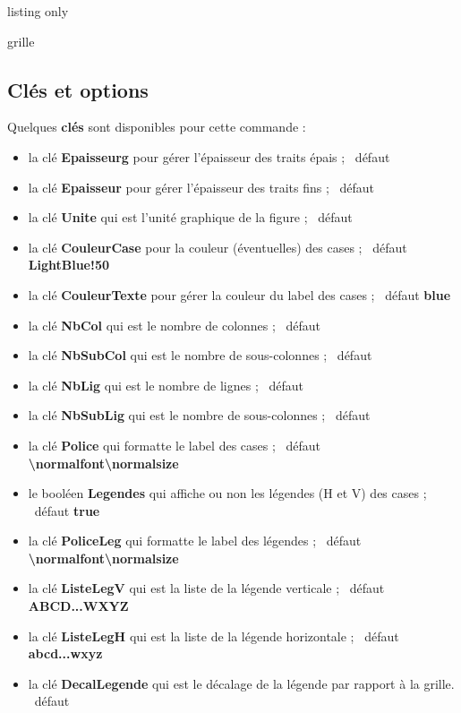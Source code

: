 \documentclass[a4paper,french,11pt]{article}
\newcommand\Cle[1]{{\bfseries\sffamily\textlangle #1\textrangle}}
\begin{document}
\begin{PresCodeTexPL}{listing only}

\begin{EnvSudoMaths}[clés]{grille}
\end{EnvSudoMaths}
\end{PresCodeTexPL}

\pagebreak

\subsection{Clés et options}

\begin{cautionblock}
Quelques \Cle{clés} sont disponibles pour cette commande :

\begin{itemize}
	\item la clé \Cle{Epaisseurg} pour gérer l'épaisseur des traits épais ; \hfill~défaut \Cle{1.5pt}
	\item la clé \Cle{Epaisseur} pour gérer l'épaisseur des traits fins ; \hfill~défaut \Cle{0.5pt}
	\item la clé \Cle{Unite} qui est l'unité graphique de la figure ; \hfill~défaut \Cle{1cm}
	\item la clé \Cle{CouleurCase} pour la couleur (éventuelles) des cases ; \hfill~défaut \Cle{LightBlue!50}
	\item la clé \Cle{CouleurTexte} pour gérer la couleur du label des cases ; \hfill~défaut \Cle{blue}
	\item la clé \Cle{NbCol} qui est le nombre de colonnes ; \hfill~défaut \Cle{9}
	\item la clé \Cle{NbSubCol} qui est le nombre de sous-colonnes ; \hfill~défaut \Cle{3}
	\item la clé \Cle{NbLig} qui est le nombre de lignes ; \hfill~défaut \Cle{9}
	\item la clé \Cle{NbSubLig} qui est le nombre de sous-colonnes ; \hfill~défaut \Cle{3}
	\item la clé \Cle{Police} qui formatte le label des cases ; \hfill~défaut \Cle{\textbackslash{}normalfont\textbackslash{}normalsize}
	\item le booléen \Cle{Legendes} qui affiche ou non les légendes (H et V) des cases ; \hfill~défaut \Cle{true}
	\item la clé \Cle{PoliceLeg} qui formatte le label des légendes ; \hfill~défaut \Cle{\textbackslash{}normalfont\textbackslash{}normalsize}
	\item la clé \Cle{ListeLegV} qui est la liste de la légende verticale ; \hfill~défaut \Cle{ABCD...WXYZ}
	\item la clé \Cle{ListeLegH} qui est la liste de la légende horizontale ; \hfill~défaut \Cle{abcd...wxyz}
	\item la clé \Cle{DecalLegende} qui est le décalage de la légende par rapport à la grille. \hfill~défaut \Cle{0.45}
\end{itemize}
\vspace*{-\baselineskip}\leavevmode
\end{cautionblock}
\end{document}
